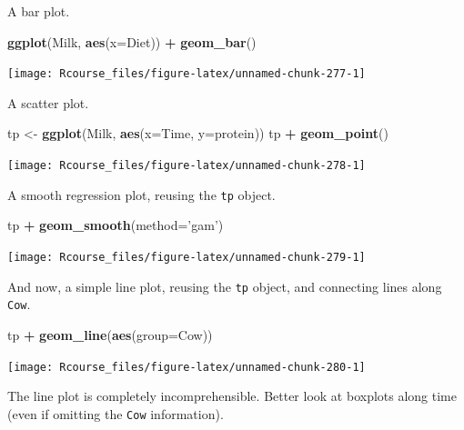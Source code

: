 \documentclass[]{book}
\newenvironment{Shaded}{\begin{snugshade}}{\end{snugshade}}
\newcommand{\DataTypeTok}[1]{\textcolor[rgb]{0.13,0.29,0.53}{#1}}
\newcommand{\KeywordTok}[1]{\textcolor[rgb]{0.13,0.29,0.53}{\textbf{#1}}}
\newcommand{\NormalTok}[1]{#1}
\newcommand{\OperatorTok}[1]{\textcolor[rgb]{0.81,0.36,0.00}{\textbf{#1}}}
\newcommand{\StringTok}[1]{\textcolor[rgb]{0.31,0.60,0.02}{#1}}
\theoremstyle{definition}
\theoremstyle{definition}
\theoremstyle{definition}
\theoremstyle{remark}
\begin{document}
A bar plot.

\begin{Shaded}
\begin{Highlighting}[]
\KeywordTok{ggplot}\NormalTok{(Milk, }\KeywordTok{aes}\NormalTok{(}\DataTypeTok{x=}\NormalTok{Diet)) }\OperatorTok{+}
\StringTok{  }\KeywordTok{geom_bar}\NormalTok{()}
\end{Highlighting}
\end{Shaded}

\texttt{[image: Rcourse\_files/figure-latex/unnamed-chunk-277-1]}

A scatter plot.

\begin{Shaded}
\begin{Highlighting}[]
\NormalTok{tp <-}\StringTok{ }\KeywordTok{ggplot}\NormalTok{(Milk, }\KeywordTok{aes}\NormalTok{(}\DataTypeTok{x=}\NormalTok{Time, }\DataTypeTok{y=}\NormalTok{protein))}
\NormalTok{tp }\OperatorTok{+}\StringTok{ }\KeywordTok{geom_point}\NormalTok{()}
\end{Highlighting}
\end{Shaded}

\texttt{[image: Rcourse\_files/figure-latex/unnamed-chunk-278-1]}

A smooth regression plot, reusing the \texttt{tp} object.

\begin{Shaded}
\begin{Highlighting}[]
\NormalTok{tp }\OperatorTok{+}\StringTok{ }\KeywordTok{geom_smooth}\NormalTok{(}\DataTypeTok{method=}\StringTok{'gam'}\NormalTok{)}
\end{Highlighting}
\end{Shaded}

\texttt{[image: Rcourse\_files/figure-latex/unnamed-chunk-279-1]}

And now, a simple line plot, reusing the \texttt{tp} object, and connecting lines along \texttt{Cow}.

\begin{Shaded}
\begin{Highlighting}[]
\NormalTok{tp }\OperatorTok{+}\StringTok{ }\KeywordTok{geom_line}\NormalTok{(}\KeywordTok{aes}\NormalTok{(}\DataTypeTok{group=}\NormalTok{Cow))}
\end{Highlighting}
\end{Shaded}

\texttt{[image: Rcourse\_files/figure-latex/unnamed-chunk-280-1]}

The line plot is completely incomprehensible.
Better look at boxplots along time (even if omitting the \texttt{Cow} information).
\end{document}
